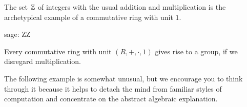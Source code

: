 \begin{example} The set $\mathbb{Z}$ of integers with the usual addition and multiplication is the archetypical example of a commutative ring with unit $1$. 
\begin{sagecommandline}
sage: ZZ
\end{sagecommandline}
\end{example}
\begin{example} Every commutative ring with unit $(R,+,\cdot,1)$ gives rise to a group, if we disregard multiplication.
\end{example}
The following example is somewhat unusual, but we encourage you to think through it because it helps to detach the mind from familiar styles of computation and concentrate on the abstract algebraic explanation.
